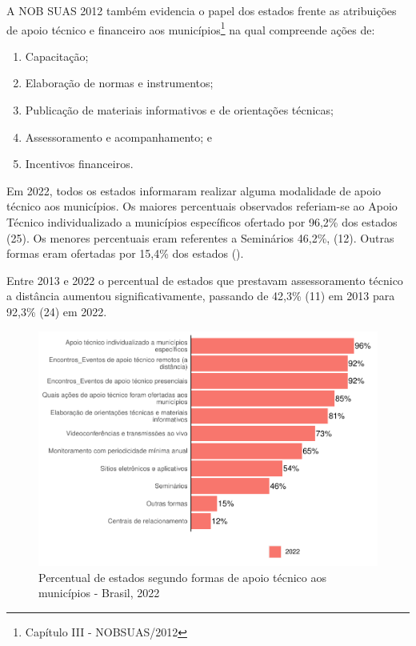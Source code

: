 \documentclass[
  brazilian]{report}
\providecommand{\tightlist}{%
  \setlength{\itemsep}{0pt}\setlength{\parskip}{0pt}}
\begin{document}
A NOB SUAS 2012 também evidencia o papel dos estados frente as
atribuições de apoio técnico e financeiro aos
municípios\footnote{Capítulo III - NOBSUAS/2012} na qual compreende
ações de:

\begin{enumerate}
\def\labelenumi{\Roman{enumi})}
\tightlist
\item
  Capacitação;
\item
  Elaboração de normas e instrumentos;
\item
  Publicação de materiais informativos e de orientações técnicas;
\item
  Assessoramento e acompanhamento; e
\item
  Incentivos financeiros.
\end{enumerate}

Em 2022, todos os estados informaram realizar alguma modalidade de apoio
técnico aos municípios. Os maiores percentuais observados referiam-se ao
Apoio Técnico individualizado a municípios específicos ofertado por
96,2\% dos estados (25). Os menores percentuais eram referentes a
Seminários 46,2\%, (12). Outras formas eram ofertadas por 15,4\% dos
estados ().

Entre 2013 e 2022 o percentual de estados que prestavam assessoramento
técnico a distância aumentou significativamente, passando de 42,3\% (11)
em 2013 para 92,3\% (24) em 2022.

\begin{figure}
\includegraphics{Censo-SUAS-2022_files/figure-latex/estados-formas-apoio-1} \caption[Percentual de estados segundo formas de apoio técnico aos municípios - Brasil, 2022]{Percentual de estados segundo formas de apoio técnico aos municípios - Brasil, 2022}\label{fig:estados-formas-apoio}
\end{figure}
\end{document}
